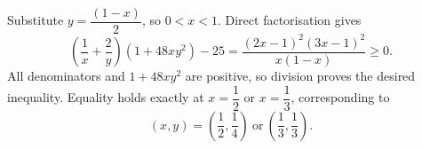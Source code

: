 Substitute $y=\dfrac{(1-x)}{2}$, so $0<x<1$. Direct factorisation gives
\[
\left(\dfrac{1}{x}+\dfrac{2}{y}\right)(1+48xy^2)-25
=\dfrac{(2x-1)^2(3x-1)^2}{x(1-x)}\ge0.
\]
All denominators and $1+48xy^2$ are positive, so division proves the desired inequality. Equality holds exactly at $x=\dfrac{1}{2}$ or $x=\dfrac{1}{3}$, corresponding to
\[
\boxed{(x,y)=(\dfrac{1}{2},\dfrac{1}{4})\ \text{or}\ (\dfrac{1}{3},\dfrac{1}{3})}.
\]
